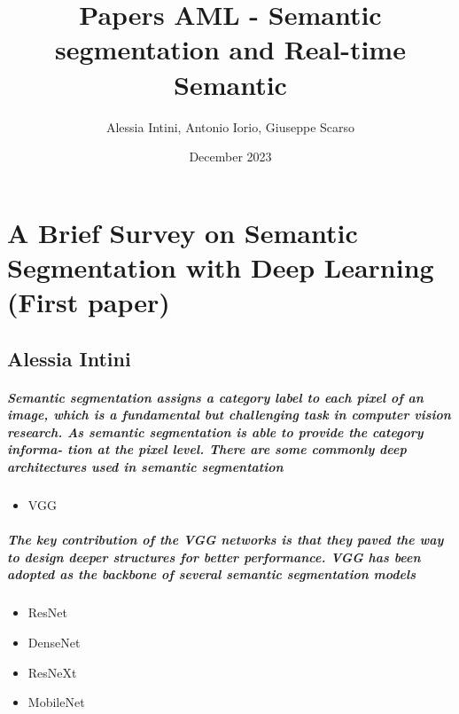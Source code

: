 \documentclass{article}
\title{Papers AML - Semantic segmentation and Real-time Semantic}
\author{Alessia Intini, Antonio Iorio, Giuseppe Scarso}
\date{December 2023}
\begin{document}
    \maketitle

    \section{A Brief Survey on Semantic Segmentation with Deep Learning (First paper)}
        \subsection{Alessia Intini}
            \subparagraph{Semantic segmentation assigns a category label to each pixel of an image, which is a fundamental but challenging task in computer vision research. As semantic segmentation is able to provide the category informa-
                tion at the pixel level.
                There are some commonly deep architectures used in semantic segmentation
            }
            \begin{itemize}
                \item VGG
            \end{itemize}
            \subparagraph{The key contribution of the VGG networks is that they paved the way to design deeper structures for better performance. VGG has been adopted as the backbone of several semantic segmentation models}
            \begin{itemize}
                \item ResNet
            \end{itemize}
            \begin{itemize}
                \item DenseNet
            \end{itemize}
            \begin{itemize}
                \item ResNeXt
            \end{itemize}
            \begin{itemize}
                \item MobileNet
            \end{itemize}
\end{document}
